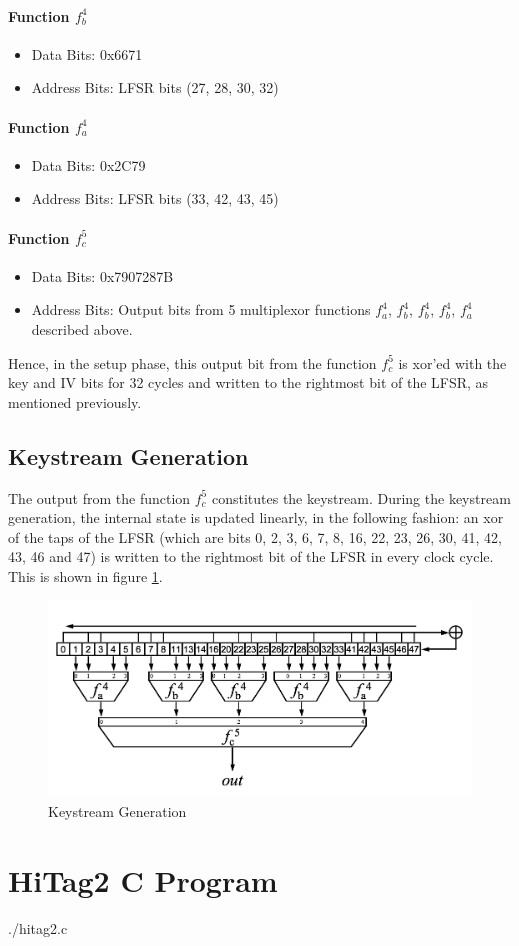 \documentclass[11pt,a4paper]{article}
\begin{document}
\paragraph{Function $f_b^4$}
\begin{itemize}
\item Data Bits: 0x6671
\item Address Bits: LFSR bits (27, 28, 30, 32)
\end{itemize}

\paragraph{Function $f_a^4$}
\begin{itemize}
\item Data Bits: 0x2C79
\item Address Bits: LFSR bits (33, 42, 43, 45)
\end{itemize}

\paragraph{Function $f_c^5$}
\begin{itemize}
\item Data Bits: 0x7907287B
\item Address Bits: Output bits from 5 multiplexor functions $f_a^4$, $f_b^4$, $f_b^4$, $f_b^4$, $f_a^4$ described above. 
\end{itemize}

Hence, in the setup phase, this output bit from the function $f_c^5$ is xor'ed with the key and IV bits for 32 cycles and written to the rightmost bit of the LFSR, as mentioned previously. 


\subsection{Keystream Generation}
The output from the function $f_c^5$ constitutes the keystream. During the keystream generation, the internal state is updated linearly, in the following fashion: an xor of the taps of the LFSR (which are bits 0, 2, 3, 6, 7, 8, 16, 22, 23, 26, 30, 41, 42, 43, 46 and 47) is written to the rightmost bit of the LFSR in every clock cycle. This is shown in figure \ref{fig:hitag2-3}.

\FloatBarrier
\begin{figure}[h]
	\centering
		\includegraphics[width=6in]{./hitag2-3.PNG}
	\caption{Keystream Generation}	
	\label{fig:hitag2-3}
\end{figure}
\FloatBarrier

\section{HiTag2 C Program}
 {./hitag2.c}

\newpage
\nocite{datasheet}
\nocite{code}


\end{document}
